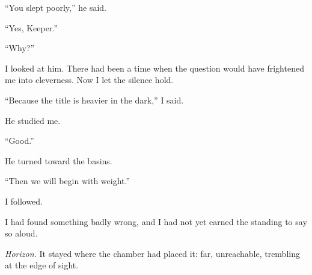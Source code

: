 ``You slept poorly,'' he said.\par

``Yes, Keeper.''\par

``Why?''\par

I looked at him. There had been a time when the question would have frightened me into cleverness. Now I let the silence hold.\par

``Because the title is heavier in the dark,'' I said.\par

He studied me.\par

``Good.''\par

He turned toward the basins.\par

``Then we will begin with weight.''\par

I followed.\par

I had found something badly wrong, and I had not yet earned the standing to say so aloud.\par

\textit{Horizon.} It stayed where the chamber had placed it: far, unreachable, trembling at the edge of sight.\par

\ornament
